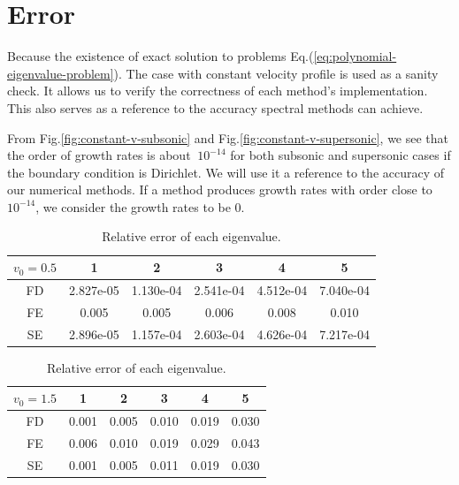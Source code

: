 \section{Error}
Because the existence of exact solution to problems Eq.(\ref{eq:polynomial-eigenvalue-problem}). The case with constant velocity profile is used as a sanity check. It allows us to verify the correctness of each method's implementation. This also serves as a reference to the accuracy spectral methods can achieve.

From Fig.\ref{fig:constant-v-subsonic} and Fig.\ref{fig:constant-v-supersonic}, we see that the order of growth rates is about $~10^{-14}$ for both subsonic and supersonic cases if the boundary condition is Dirichlet. We will use it a reference to the accuracy of our numerical methods. If a method produces growth rates with order close to $10^{-14}$, we consider the growth rates to be 0.

\begin{table} [H]
	\centering
	\caption{Relative error of each eigenvalue.}
	\begin{tabular}{|c|c|c|c|c|c|}
		\hline
		$v_0=0.5$   & 1 & 2 & 3 & 4 & 5 \\
		\hline
		FD & 2.827e-05 & 1.130e-04 & 2.541e-04 & 4.512e-04 & 7.040e-04 \\
		\hline
		FE & 0.005 & 0.005 & 0.006 & 0.008 & 0.010  \\
		\hline
		SE & 2.896e-05 & 1.157e-04 & 2.603e-04 & 4.626e-04 & 7.217e-04 \\
		\hline
	\end{tabular}
	\begin{tabular}{|c|c|c|c|c|c|}
		\hline
		$v_0=1.5$   & 1 & 2 & 3 & 4 & 5 \\
		\hline
		FD & 0.001 & 0.005 & 0.010 & 0.019 & 0.030 \\
		\hline
		FE & 0.006 & 0.010 & 0.019 & 0.029 & 0.043  \\
		\hline
		SE & 0.001 & 0.005 & 0.011 & 0.019 & 0.030 \\
		\hline
	\end{tabular}
	\label{table:eigenvalue-error-fixed-fixed}
\end{table}

